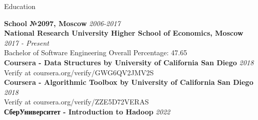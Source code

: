 \documentclass{resume} %
\begin{document}
\begin{rSection}{Education}

{\bf School №2097, Moscow} \hfill {\em 2006-2017}
\\{\bf National Research University Higher School of Economics, Moscow} \hfill {\em 2017 - Present} 
\\ Bachelor of Software Engineering \hfill { Overall Percentage: 47.65 }
\\{\bf Coursera - Data Structures by University of California San Diego} \hfill {\em 2018} 
\\ Verify at coursera.org/verify/GWG6QV2JMV2S
\\{\bf Coursera - Algorithmic Toolbox by University of California San Diego} \hfill {\em 2018} 
\\ Verify at coursera.org/verify/ZZE5D72VERAS
\\{\bf СберУниверситет - Introduction to Hadoop} \hfill {\em 2022} 



\end{rSection}
\end{document}
